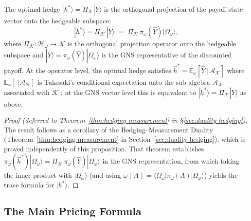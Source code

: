 \begin{proposition}\label{prop:hedging-measurement}
The optimal hedge $|h^*\rangle = \Pi_{\mathcal{K}} |Y\rangle$ is the
orthogonal projection of the payoff-state vector onto the hedgeable subspace:
\begin{equation*}
    |h^*\rangle = \Pi_{\mathcal{K}}\,|Y\rangle
    \;=\; \Pi_{\mathcal{K}}\,\pi_\omega(\hat{Y})|\Omega_\omega\rangle,
\end{equation*}
where $\Pi_{\mathcal{K}} : \mathcal{H}_\omega \to \mathcal{K}$ is the
orthogonal projection operator onto the hedgeable subspace and
$|Y\rangle = \pi_\omega(\hat{Y})|\Omega_\omega\rangle$ is the GNS
representative of the discounted payoff. At the operator level, the optimal hedge
satisfies $\hat{h}^* = \mathbb{E}_\omega[\hat{Y}\,|\,\mathcal{A}_{\mathcal{K}}]$
where $\mathbb{E}_\omega[\cdot|\mathcal{A}_{\mathcal{K}}]$ is Takesaki's
conditional expectation onto the sub-algebra $\mathcal{A}_{\mathcal{K}}$
associated with $\mathcal{K}$
\citep{takesaki2003theory}; at the GNS vector level this is equivalent to
$|h^*\rangle = \Pi_{\mathcal{K}}|Y\rangle$ as above.
\end{proposition}

\begin{proof}[Proof (deferred to Theorem~\ref{thm:hedging-measurement} in \S\ref{sec:duality-hedging})]
The result follows as a corollary of the Hedging--Measurement Duality
(Theorem~\ref{thm:hedging-measurement} in Section~\ref{sec:duality-hedging}),
which is proved independently of this proposition.
That theorem establishes
$\pi_\omega(\hat{h}^*)|\Omega_\omega\rangle
 = \Pi_{\mathcal{K}}\,\pi_\omega(\hat{Y})|\Omega_\omega\rangle$
in the GNS representation, from which taking the inner product with
$|\Omega_\omega\rangle$ (and using
$\omega(A) = \langle\Omega_\omega|\pi_\omega(A)|\Omega_\omega\rangle$) yields
the trace formula for $|h^*\rangle$.
\end{proof}

\subsection{The Main Pricing Formula}

